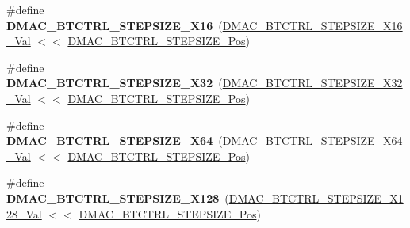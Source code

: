 \begin{DoxyCompactItemize}
\item 
\hypertarget{group___s_a_m_l21___d_m_a_c_gaf58c8cb48a72aa44c3670e63e59597fb}{}\#define {\bfseries D\+M\+A\+C\+\_\+\+B\+T\+C\+T\+R\+L\+\_\+\+S\+T\+E\+P\+S\+I\+Z\+E\+\_\+\+X16}~(\hyperlink{group___s_a_m_l21___d_m_a_c_ga6be80c72116b230cffb8afd5874cae02}{D\+M\+A\+C\+\_\+\+B\+T\+C\+T\+R\+L\+\_\+\+S\+T\+E\+P\+S\+I\+Z\+E\+\_\+\+X16\+\_\+\+Val}  $<$$<$ \hyperlink{group___s_a_m_l21___d_m_a_c_gacf7558693207543fbd9048f7f76fa238}{D\+M\+A\+C\+\_\+\+B\+T\+C\+T\+R\+L\+\_\+\+S\+T\+E\+P\+S\+I\+Z\+E\+\_\+\+Pos})\label{group___s_a_m_l21___d_m_a_c_gaf58c8cb48a72aa44c3670e63e59597fb}

\item 
\hypertarget{group___s_a_m_l21___d_m_a_c_ga31273a4dd27e1c0bec6a37b10ee6fbbd}{}\#define {\bfseries D\+M\+A\+C\+\_\+\+B\+T\+C\+T\+R\+L\+\_\+\+S\+T\+E\+P\+S\+I\+Z\+E\+\_\+\+X32}~(\hyperlink{group___s_a_m_l21___d_m_a_c_gabc372a6f4800c89ffc625b791a95a710}{D\+M\+A\+C\+\_\+\+B\+T\+C\+T\+R\+L\+\_\+\+S\+T\+E\+P\+S\+I\+Z\+E\+\_\+\+X32\+\_\+\+Val}  $<$$<$ \hyperlink{group___s_a_m_l21___d_m_a_c_gacf7558693207543fbd9048f7f76fa238}{D\+M\+A\+C\+\_\+\+B\+T\+C\+T\+R\+L\+\_\+\+S\+T\+E\+P\+S\+I\+Z\+E\+\_\+\+Pos})\label{group___s_a_m_l21___d_m_a_c_ga31273a4dd27e1c0bec6a37b10ee6fbbd}

\item 
\hypertarget{group___s_a_m_l21___d_m_a_c_ga47f51f2254b08988f3941766f9e5f95a}{}\#define {\bfseries D\+M\+A\+C\+\_\+\+B\+T\+C\+T\+R\+L\+\_\+\+S\+T\+E\+P\+S\+I\+Z\+E\+\_\+\+X64}~(\hyperlink{group___s_a_m_l21___d_m_a_c_ga4c940b8055fe3e170f6d069523d1dc5a}{D\+M\+A\+C\+\_\+\+B\+T\+C\+T\+R\+L\+\_\+\+S\+T\+E\+P\+S\+I\+Z\+E\+\_\+\+X64\+\_\+\+Val}  $<$$<$ \hyperlink{group___s_a_m_l21___d_m_a_c_gacf7558693207543fbd9048f7f76fa238}{D\+M\+A\+C\+\_\+\+B\+T\+C\+T\+R\+L\+\_\+\+S\+T\+E\+P\+S\+I\+Z\+E\+\_\+\+Pos})\label{group___s_a_m_l21___d_m_a_c_ga47f51f2254b08988f3941766f9e5f95a}

\item 
\hypertarget{group___s_a_m_l21___d_m_a_c_ga28aacefebb6ec92b8bf77f2059fe05a2}{}\#define {\bfseries D\+M\+A\+C\+\_\+\+B\+T\+C\+T\+R\+L\+\_\+\+S\+T\+E\+P\+S\+I\+Z\+E\+\_\+\+X128}~(\hyperlink{group___s_a_m_l21___d_m_a_c_gac60f6c18ae8ba088c4b1c09764074bb5}{D\+M\+A\+C\+\_\+\+B\+T\+C\+T\+R\+L\+\_\+\+S\+T\+E\+P\+S\+I\+Z\+E\+\_\+\+X128\+\_\+\+Val} $<$$<$ \hyperlink{group___s_a_m_l21___d_m_a_c_gacf7558693207543fbd9048f7f76fa238}{D\+M\+A\+C\+\_\+\+B\+T\+C\+T\+R\+L\+\_\+\+S\+T\+E\+P\+S\+I\+Z\+E\+\_\+\+Pos})\label{group___s_a_m_l21___d_m_a_c_ga28aacefebb6ec92b8bf77f2059fe05a2}


\end{DoxyCompactItemize}
